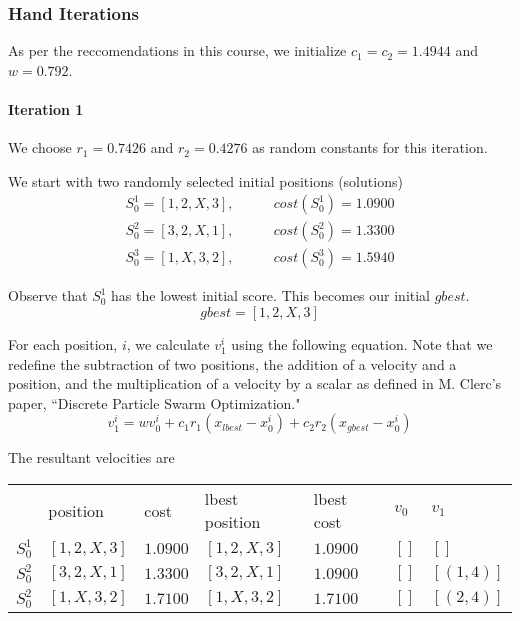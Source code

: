 \documentclass[a4paper]{article}
\newcommand{\subsubsubsection}[1]{\paragraph{#1} \mbox{}}
\begin{document}
\subsubsection{Hand Iterations}

As per the reccomendations in this course, we initialize $c_1 = c_2 = 1.4944$ and $w = 0.792$.

\subsubsubsection{Iteration 1}

We choose $r_1 = 0.7426$ and $r_2 = 0.4276$ as random constants for this iteration.

We start with two randomly selected initial positions (solutions)
\begin{align*}
S_0^1 = [1, 2, X, 3], & \qquad cost(S_0^1) = 1.0900 \\
S_0^2 = [3, 2, X, 1], & \qquad cost(S_0^2) = 1.3300 \\
S_0^3 = [1, X, 3, 2], & \qquad cost(S_0^3) = 1.5940
\end{align*}

Observe that $S_0^1$ has the lowest initial score. This becomes our initial $\mathit{gbest}$.
$$\mathit{gbest} = [1, 2, X, 3]$$

For each position, $i$, we calculate $v_1^i$ using the following equation. Note that we redefine the subtraction of two positions, the addition of a velocity and a position, and the multiplication of a velocity by a scalar as defined in M. Clerc's paper, ``Discrete Particle Swarm Optimization."
$$v_1^i = w v_0^i + c_1 r_1 (x_\mathit{lbest} - x_0^i) + c_2 r_2 (x_\mathit{gbest} - x_0^i)$$

The resultant velocities are \mbox{}
\begin{center}
\begin{tabular}{lllllll}
        & position     & cost   & lbest position & lbest cost & $v_0$  & $v_1$    \\
$S_0^1$ & $[1, 2, X, 3]$ & $1.0900$ & $[1, 2, X, 3]$   & $1.0900$     & $[]$     & $[]      $ \\
$S_0^2$ & $[3, 2, X, 1]$ & $1.3300$ & $[3, 2, X, 1]$   & $1.0900$     & $[]$     & $[(1, 4)]$ \\
$S_0^2$ & $[1, X, 3, 2]$ & $1.7100$ & $[1, X, 3, 2]$   & $1.7100$     & $[]$     & $[(2, 4)]$ \\
\end{tabular}
\end{center}
\end{document}
